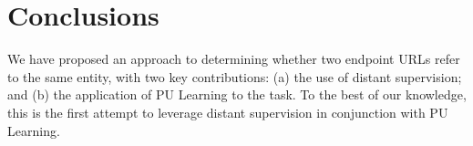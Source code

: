 \documentclass[letterpaper]{sig-alternate-2013}
\begin{document}
%


\section{Conclusions}

We have proposed an approach to determining whether two endpoint URLs refer to the same entity, with two key contributions: (a) the use of distant supervision; and (b) the application of PU Learning to the task. To the best of our knowledge, this is the first attempt to leverage distant supervision in conjunction with PU Learning. 


  
\end{document}
